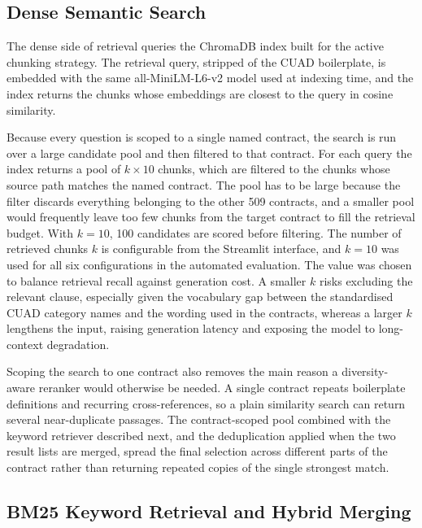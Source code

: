 \subsection{Dense Semantic Search}
The dense side of retrieval queries the ChromaDB index built for the active chunking strategy. The retrieval query, stripped of the CUAD boilerplate, is embedded with the same all-MiniLM-L6-v2 model used at indexing time, and the index returns the chunks whose embeddings are closest to the query in cosine similarity.

Because every question is scoped to a single named contract, the search is run over a large candidate pool and then filtered to that contract. For each query the index returns a pool of $k \times 10$ chunks, which are filtered to the chunks whose source path matches the named contract. The pool has to be large because the filter discards everything belonging to the other 509 contracts, and a smaller pool would frequently leave too few chunks from the target contract to fill the retrieval budget. With $k = 10$, 100 candidates are scored before filtering. The number of retrieved chunks $k$ is configurable from the Streamlit interface, and $k = 10$ was used for all six configurations in the automated evaluation. The value was chosen to balance retrieval recall against generation cost. A smaller $k$ risks excluding the relevant clause, especially given the vocabulary gap between the standardised CUAD category names and the wording used in the contracts, whereas a larger $k$ lengthens the input, raising generation latency and exposing the model to long-context degradation.

Scoping the search to one contract also removes the main reason a diversity-aware reranker would otherwise be needed. A single contract repeats boilerplate definitions and recurring cross-references, so a plain similarity search can return several near-duplicate passages. The contract-scoped pool combined with the keyword retriever described next, and the deduplication applied when the two result lists are merged, spread the final selection across different parts of the contract rather than returning repeated copies of the single strongest match.


\subsection{BM25 Keyword Retrieval and Hybrid Merging}

